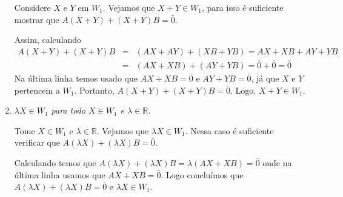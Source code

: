 \documentclass[11pt]{exam}
\begin{document}
\begin{questions}
\begin{parts}
\begin{solution}
\begin{enumerate}
          Considere $X$ e $Y$ em $W_{1}$. 
          Vejamos que $X+Y \in W_{1}$, para isso é suficiente mostrar que 
          $A(X+Y)+(X+Y)B=\bar{0}$.
          
          Assim, calculando 
             $$
             \begin{array}{lll}
             A(X+Y)+(X+Y)B&=&(AX+AY)+(XB+YB)=AX+XB+AY+YB \\
                        &=&(AX+XB)+(AY+YB)=\bar{0}+\bar{0}=\bar{0}
             \end{array}
             $$ 
          Na última linha temos  usado que $AX+XB=\bar{0}$ e
           $AY+YB=\bar{0}$, já que $X$ e $Y$ pertencem a $W_1$.
           Portanto, $A(X+Y)+(X+Y)B=\bar{0}$. Logo, $X+Y \in W_{1}$.          
          \item {\it $\lambda X\in W_{1}$ para todo $X\in W_1$ e
                 $\lambda \in \mathbb{R}$.} 
                 
           Tome $X \in W_1$ e $\lambda \in \mathbb{R}$. Vejamos que 
           $\lambda X \in W_{1}$. Nessa caso é suficiente verificar que 
           $A(\lambda X)+(\lambda X)B=\bar{0}$.
           
           Calculando temos que
            $A(\lambda X)+(\lambda X)B=\lambda(AX+XB)=\bar{0}$ 
            onde na última linha usamos que $AX+XB=\bar{0}$. Logo concluímos  que 
            $A(\lambda X)+(\lambda X)B=\bar{0}$ e $\lambda X \in W_{1}$.   
        \end{enumerate}              
     \end{solution}

\end{parts}
\end{questions}
\end{document}
